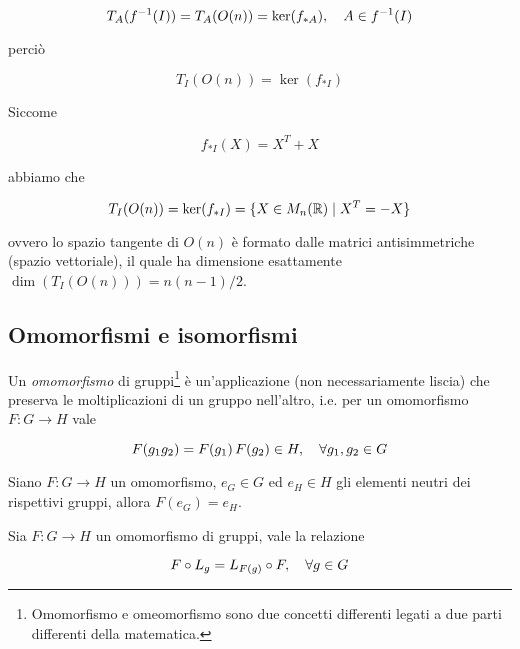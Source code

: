 \begin{equation}
	T_{A}(f^{-1}(I)) = T_{A}(O(n)) = \ker(f_{*A}) \qcomma A \in f^{-1}(I)
\end{equation}

perciò

\begin{equation}
	T_{I}(O(n)) = \ker(f_{*I})
\end{equation}

Siccome

\begin{equation}
	f_{*I}(X) = X^{T} + X
\end{equation}

abbiamo che

\begin{equation}
	T_{I}(O(n)) = \ker(f_{*I}) = \{ X \in M_{n}(\mathbb{R}) \mid X^{T} = -X \}
\end{equation}

ovvero lo spazio tangente di $ O(n) $ è formato dalle matrici antisimmetriche (spazio vettoriale), il quale ha dimensione esattamente $ \dim(T_{I}(O(n))) = n(n-1)/2 $.

\subsection{Omomorfismi e isomorfismi}

Un \textit{omomorfismo} di gruppi\footnote{%
	Omomorfismo e omeomorfismo sono due concetti differenti legati a due parti differenti della matematica.%
} è un'applicazione (non necessariamente liscia) che preserva le moltiplicazioni di un gruppo nell'altro, i.e. per un omomorfismo $ F : G \to H $ vale

\begin{equation}
	F(g_{1} g_{2}) = F(g_{1}) \, F(g_{2}) \in H \qcomma \forall g_{1},g_{2} \in G
\end{equation}

\begin{remark}
Siano $ F : G \to H $ un omomorfismo, $ e_{G} \in G $ ed $ e_{H} \in H $ gli elementi neutri dei rispettivi gruppi, allora $ F(e_{G}) = e_{H} $.
\end{remark}

\begin{definition}
	Sia $ F : G \to H $ un omomorfismo di gruppi, vale la relazione
	
	\begin{equation}
		F \circ L_{g} = L_{F(g)} \circ F \qcomma \forall g \in G
	\end{equation}
\end{definition}

